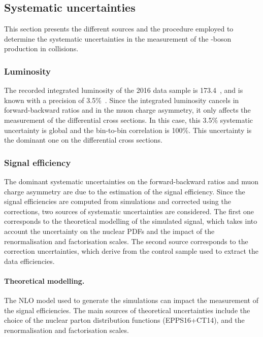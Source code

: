 \subsection{Systematic uncertainties}\label{sec:WBoson_Analysis_Systematics}

This section presents the different sources and the procedure employed to determine the systematic uncertainties in the measurement of the \Wb-boson production in \RunpPb collisions. 

\subsubsection{Luminosity}

The recorded integrated luminosity of the 2016 \RunpPb data sample is 173.4~\nbinv, and is known with a precision of 3.5\%~\cite{LUM-17-002}. Since the integrated luminosity cancels in forward-backward ratios and in the muon charge asymmetry, it only affects the measurement of the \WToMuNu differential cross sections. In this case, this 3.5\% systematic uncertainty is global and the bin-to-bin correlation is 100\%. This uncertainty is the dominant one on the \WToMuNu differential cross sections.


\subsubsection{Signal efficiency}

The dominant systematic uncertainties on the forward-backward ratios and muon charge asymmetry are due to the estimation of the signal efficiency. Since the signal efficiencies are computed from simulations and corrected using the \tnp corrections, two sources of systematic uncertainties are considered. The first one corresponds to the theoretical modelling of the simulated signal, which takes into account the uncertainty on the nuclear PDFs and the impact of the renormalisation and factorisation scales. The second source corresponds to the \tnp correction uncertainties, which derive from the \ZToMuMu control sample used to extract the \tnp data efficiencies.

\paragraph{Theoretical modelling.} The NLO model used to generate the simulations can impact the measurement of the signal efficiencies. The main sources of theoretical uncertainties include the choice of the nuclear parton distribution functions (EPPS16+CT14), and the renormalisation and factorisation scales.

